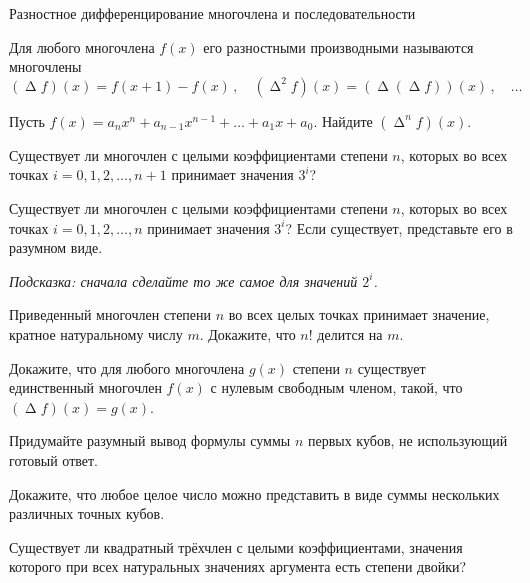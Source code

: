 
\worksheet
    {Разностное дифференцирование многочлена и последовательности}


\begingroup
    \ifdefined\mupDelta
        \def\diff{\mathup{\mupDelta}}
    \fi \ifdefined\upDelta
        \def\diff{\upDelta}
    \fi
    \providecommand\diff{\Delta}

Для любого многочлена $f(x)$ его разностными производными называются многочлены
\[
    (\diff f)(x) = f(x + 1) - f(x)
\, , \quad
    (\diff^2 f)(x) = (\diff(\diff f))(x)
\, , \quad \ldots
\]

\begin{problems}

\item
Пусть $f(x) = a_{n} x^{n} + a_{n-1} x^{n-1} + \ldots + a_{1} x + a_{0}$.
Найдите $(\diff^{n} f)(x)$.

\item
Существует ли многочлен с целыми коэффициентами степени $n$, которых во всех
точках $i = 0, 1, 2, \ldots, n + 1$ принимает значения $3^{i}$?

\item
Существует ли многочлен с целыми коэффициентами степени $n$, которых во всех
точках $i = 0, 1, 2, \ldots, n$ принимает значения $3^{i}$?
Если существует, представьте его в разумном виде.
\par
\emph{Подсказка: сначала сделайте то же самое для значений $2^{i}$.}

\item
Приведенный многочлен степени $n$ во всех целых точках принимает значение,
кратное натуральному числу $m$.
Докажите, что $n!$ делится на $m$.

\item
Докажите, что для любого многочлена $g(x)$ степени $n$ существует единственный
многочлен $f(x)$ с нулевым свободным членом, такой, что $(\diff f)(x) = g(x)$.

\item
Придумайте разумный вывод формулы суммы $n$ первых кубов, не использующий
готовый ответ.

\item
Докажите, что любое целое число можно представить в виде суммы нескольких
различных точных кубов.

\item
Существует ли квадратный трёхчлен с целыми коэффициентами, значения которого
при всех натуральных значениях аргумента есть степени двойки?

\end{problems}

\endgroup %

